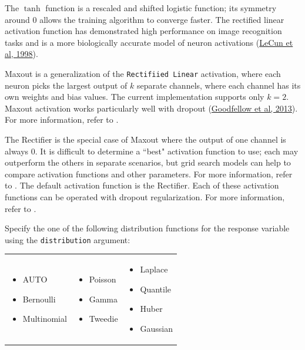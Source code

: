 The $\tanh$ function is a rescaled and shifted logistic function; its symmetry around 0 allows the training algorithm to converge faster. The rectified linear activation function has demonstrated high performance on image recognition tasks and is a more biologically accurate model of neuron activations (\href{http://yann.lecun.com/exdb/publis/pdf/lecun-98b.pdf}{LeCun et al, 1998}). 

Maxout is a generalization of the \texttt{Rectifiied Linear} activation, where each neuron picks the largest output of $k$ separate channels, where each channel has its own weights and bias values. The current implementation supports only $k=2$. Maxout activation works particularly well with dropout (\href{http://arxiv.org/pdf/1302.4389.pdf}{Goodfellow et al, 2013}). For more information, refer to {\textbf{}}.

The Rectifier is the special case of Maxout where the output of one channel is always 0.
It is difficult to determine a ``best" activation function to use; each may outperform the others in separate scenarios, but grid search models can help to compare activation functions and other parameters.  For more information, refer to {\textbf{}}. The default activation function is the Rectifier. Each of these activation functions can be operated with dropout regularization. For more information, refer to {\textbf{}}.

Specify the one of the following distribution functions for the response variable using the \texttt{distribution} argument: 

\begin{frame}%

\begin{tabular}{p{4cm}p{4cm}p{4cm}}

\begin{itemize}
     \item AUTO
     \item Bernoulli
     \item Multinomial
  \end{itemize} &

\begin{itemize}
  \item Poisson
  \item Gamma
  \item Tweedie
\end{itemize} &

\begin{itemize}
  \item Laplace
  \item Quantile
  \item Huber
  \item Gaussian
\end{itemize}\\

\end{tabular}

\end{frame}

